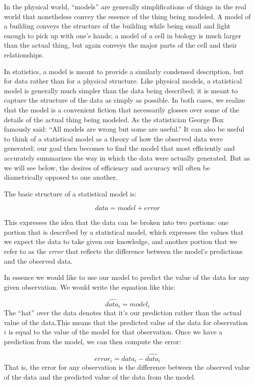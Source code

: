 \documentclass[
  12pt,
]{book}
\begin{document}
In the physical world, ``models'' are generally simplifications of things in the real world that nonetheless convey the essence of the thing being modeled. A model of a building conveys the structure of the building while being small and light enough to pick up with one's hands; a model of a cell in biology is much larger than the actual thing, but again conveys the major parts of the cell and their relationships.

In statistics, a model is meant to provide a similarly condensed description, but for data rather than for a physical structure. Like physical models, a statistical model is generally much simpler than the data being described; it is meant to capture the structure of the data as simply as possible. In both cases, we realize that the model is a convenient fiction that necessarily glosses over some of the details of the actual thing being modeled. As the statistician George Box famously said: ``All models are wrong but some are useful.'' It can also be useful to think of a statistical model as a theory of how the observed data were generated; our goal then becomes to find the model that most efficiently and accurately summarizes the way in which the data were actually generated. But as we will see below, the desires of efficiency and accuracy will often be diametrically opposed to one another.

The basic structure of a statistical model is:

\[
data = model + error
\]

This expresses the idea that the data can be broken into two portions: one portion that is described by a statistical model, which expresses the values that we expect the data to take given our knowledge, and another portion that we refer to as the \emph{error} that reflects the difference between the model's predictions and the observed data.

In essence we would like to use our model to predict the value of the data for any given observation. We would write the equation like this:

\[
\widehat{data_i} = model_i
\]
The ``hat'' over the data denotes that it's our prediction rather than the actual value of the data.This means that the predicted value of the data for observation \(i\) is equal to the value of the model for that observation. Once we have a prediction from the model, we can then compute the error:

\[
error_i = data_i - \widehat{data_i}
\]
That is, the error for any observation is the difference between the observed value of the data and the predicted value of the data from the model.
\end{document}
